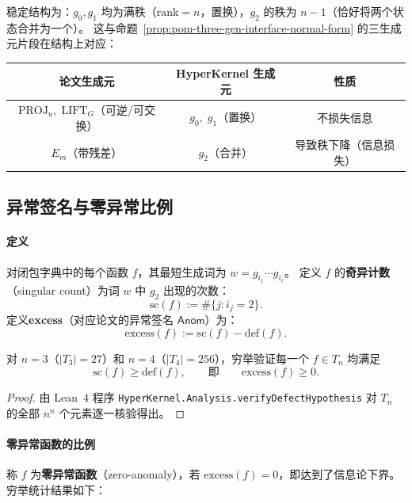 \noindent
稳定结构为：$g_0,g_1$ 均为满秩（$\mathrm{rank}=n$，置换），$g_2$ 的秩为 $n{-}1$（恰好将两个状态合并为一个）。
这与命题~\ref{prop:pom-three-gen-interface-normal-form} 的三生成元片段在结构上对应：

\begin{center}
\begin{tabular}{c|c|c}
\toprule
论文生成元 & HyperKernel 生成元 & 性质 \\
\midrule
$\mathrm{PROJ}_u,\;\mathrm{LIFT}_G$（可逆/可交换） & $g_0,\;g_1$（置换） & 不损失信息 \\
$E_m$（带残差） & $g_2$（合并） & 导致秩下降（信息损失）\\
\bottomrule
\end{tabular}
\end{center}

\subsection{异常签名与零异常比例}

\paragraph{定义}
对闭包字典中的每个函数 $f$，其最短生成词为 $w=g_{i_1}\cdots g_{i_\ell}$。
定义 $f$ 的\textbf{奇异计数}（singular count）为词 $w$ 中 $g_2$ 出现的次数：
$$
\mathrm{sc}(f):=\#\{j : i_j = 2\}.
$$
定义\textbf{excess}（对应论文的异常签名 $\mathsf{Anom}$）为：
$$
\mathrm{excess}(f):=\mathrm{sc}(f)-\mathrm{def}(f).
$$

\begin{proposition}\label{prop:formal-singular-lower-bound}
对 $n=3$（$|T_3|=27$）和 $n=4$（$|T_4|=256$），穷举验证每一个 $f\in T_n$ 均满足
$$
\mathrm{sc}(f)\ge \mathrm{def}(f),
\qquad\text{即}\qquad
\mathrm{excess}(f)\ge 0.
$$
\end{proposition}

\begin{proof}
由 Lean~4 程序 \texttt{HyperKernel.Analysis.verifyDefectHypothesis} 对 $T_n$ 的全部 $n^n$ 个元素逐一核验得出。
\end{proof}

\paragraph{零异常函数的比例}
称 $f$ 为\textbf{零异常函数}（zero-anomaly），若 $\mathrm{excess}(f)=0$，即达到了信息论下界。
穷举统计结果如下：

